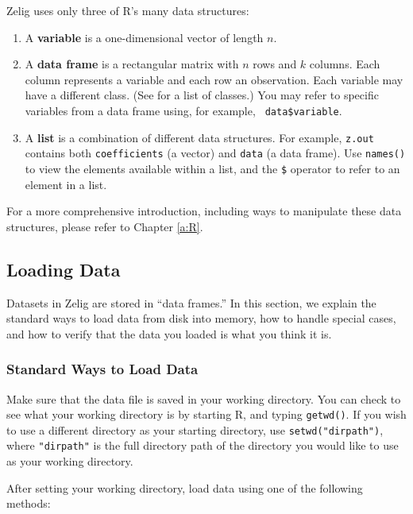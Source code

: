 Zelig uses only three of R's many data structures: 
\begin{enumerate}
\item A {\bf variable} is a one-dimensional vector of length $n$.
\item A {\bf data frame} is a rectangular matrix with $n$ rows and $k$
  columns.  Each column represents a variable and each row an
  observation.  Each variable may have a different class.  (See
   for a list of classes.)  You may refer to
  specific variables from a data frame using, for example, {\tt
    data\$variable}.
\item A {\bf list} is a combination of different data structures.  For
  example, {\tt z.out} contains both {\tt coefficients} (a vector) and
  {\tt data} (a data frame).  Use {\tt names()} to view the elements
  available within a list, and the {\tt \$} operator to refer to an
  element in a list.
\end{enumerate}

For a more comprehensive introduction, including ways to manipulate
these data structures, please refer to Chapter \ref{a:R}.

\subsection{Loading Data}\label{load.data}

Datasets in Zelig are stored in ``data frames.'' In this section, we
explain the standard ways to load data from disk into memory, how to
handle special cases, and how to verify that the data you loaded is
what you think it is.

\subsubsection*{Standard Ways to Load Data}

Make sure that the data file is saved in your working directory.  You
can check to see what your working directory is by starting R, and
typing {\tt getwd()}.  If you wish to use a different directory as
your starting directory, use \verb|setwd("dirpath")|, where
\verb|"dirpath"| is the full directory path of the directory you would
like to use as your working directory.  

After setting your working directory, load data using one of the
following methods:  

